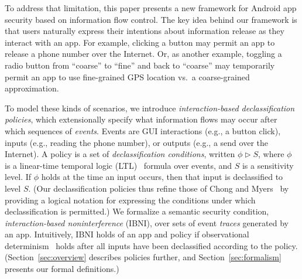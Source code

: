 \documentclass{llncs}
\newcommand{\comment}[3][\color{red}]{{#1{[{#2}: {#3}]}}}
\newcommand{\kris}[1]{\comment[\color{orange}]{kris}{#1}}
\newcommand{\mrc}[1]{\comment[\color{blue}]{MRC}{#1}}
\begin{document}
To address that limitation, this paper presents a new framework for
Android app security based on information flow control.  The key idea
behind our framework is that users naturally express their intentions
about information release as they interact with an app.
For example,
clicking a button may permit an app to release a phone number over the
Internet. Or, as another example,
toggling a radio button from ``coarse'' to ``fine'' and back to
  ``coarse'' may temporarily permit an app to use fine-grained GPS
  location vs.\ a coarse-grained approximation.

To model these kinds of scenarios, we introduce
\emph{interaction-based declassification policies}, which
extensionally specify what information flows may occur after which
sequences of \emph{events}.  Events are GUI interactions (e.g., a
button click), inputs (e.g., reading
the phone number), or outputs (e.g., a send over the Internet).
A policy is a set of \emph{declassification conditions}, written
$\phi \mathrel\rhd S$, where $\phi$ is a linear-time temporal logic
(LTL)~\cite{Pnueli:1977} formula over events, and $S$ is a sensitivity
level.  If $\phi$ holds at the time an input occurs, then that input
is declassified to level $S$.  (Our declassification policies thus
refine those of Chong and Myers~\cite{Chong:04} by providing a logical
notation for expressing the conditions under which declassification is
permitted.) We formalize a semantic security condition,
\emph{interaction-based noninterference} (IBNI), over sets of event
\emph{traces} generated by an app.  Intuitively, IBNI holds of an app
and policy if observational
determinism~\cite{Zdancewic:03} holds after all inputs have been
declassified according to the policy. 
(Section~\ref{sec:overview}
describes policies further, and Section~\ref{sec:formalism} presents
our formal definitions.)

\end{document}

